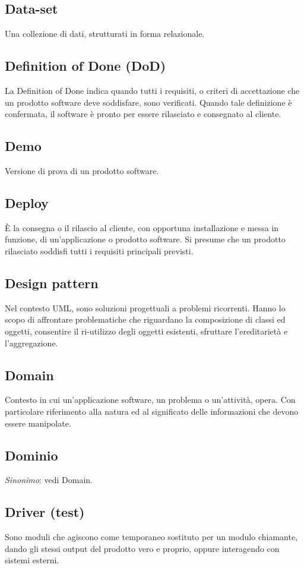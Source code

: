 	\subsection*{Data-set}
	Una collezione di dati, strutturati in forma relazionale.
	\subsection*{Definition of Done (DoD)}
	La Definition of Done indica quando tutti i requisiti, o criteri di accettazione che un prodotto software deve soddisfare, sono verificati. Quando tale definizione è confermata, il software è pronto per essere rilasciato e consegnato al cliente.
	\subsection*{Demo}
	Versione di prova di un prodotto software.
	\subsection*{Deploy}
	È la consegna o il rilascio al cliente, con opportuna installazione e messa in funzione, di un’applicazione o prodotto software. Si presume che un prodotto rilasciato soddisfi tutti i requisiti principali previsti.
	\subsection*{Design pattern}
	Nel contesto UML, sono soluzioni progettuali a problemi ricorrenti. Hanno lo scopo di affrontare problematiche che riguardano la composizione di classi ed oggetti, consentire il ri-utilizzo degli oggetti esistenti, sfruttare l’ereditarietà e l’aggregazione.
	\subsection*{Domain}
	Contesto in cui un’applicazione software, un problema o un’attività, opera. Con particolare riferimento alla natura ed al significato delle informazioni che devono essere manipolate.
	\subsection*{Dominio}
	\emph{Sinonimo}: vedi Domain.
	\subsection*{Driver (test)}
	Sono moduli che agiscono come temporaneo sostituto per un modulo chiamante, dando gli stessi output del prodotto vero e proprio, oppure interagendo con sistemi esterni.
\pagebreak
